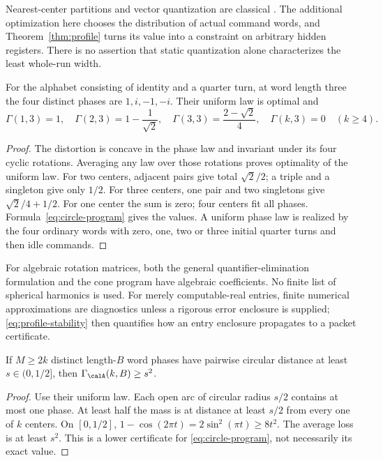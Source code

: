 Nearest-center partitions and vector quantization are classical \cite{GL}. The additional optimization here chooses the distribution of actual command words, and Theorem~\ref{thm:profile} turns its value into a constraint on arbitrary hidden registers. There is no assertion that static quantization alone characterizes the least whole-run width.

\begin{proposition}\label{prop:square-packet}
For the alphabet consisting of identity and a quarter turn, at word length three the four distinct phases are $1,i,-1,-i$. Their uniform law is optimal and
\[
 \Gamma(1,3)=1,\quad \Gamma(2,3)=1-\frac1{\sqrt2},\quad
 \Gamma(3,3)=\frac{2-\sqrt2}{4},\quad \Gamma(k,3)=0\quad(k\ge4).
\]
\end{proposition}
\begin{proof}
The distortion is concave in the phase law and invariant under its four cyclic rotations. Averaging any law over those rotations proves optimality of the uniform law. For two centers, adjacent pairs give total $\sqrt2/2$; a triple and a singleton give only $1/2$. For three centers, one pair and two singletons give $\sqrt2/4+1/2$. For one center the sum is zero; four centers fit all phases. Formula~\eqref{eq:circle-program} gives the values. A uniform phase law is realized by the four ordinary words with zero, one, two or three initial quarter turns and then idle commands.
\end{proof}

For algebraic rotation matrices, both the general quantifier-elimination formulation and the cone program have algebraic coefficients. No finite list of spherical harmonics is used. For merely computable-real entries, finite numerical approximations are diagnostics unless a rigorous error enclosure is supplied; \eqref{eq:profile-stability} then quantifies how an entry enclosure propagates to a packet certificate.

\begin{corollary}\label{cor:separated}
If $M\ge2k$ distinct length-$B$ word phases have pairwise circular distance at least $s\in(0,1/2]$, then $\Gamma_{\calA}(k,B)\ge s^2$.
\end{corollary}
\begin{proof}
Use their uniform law. Each open arc of circular radius $s/2$ contains at most one phase. At least half the mass is at distance at least $s/2$ from every one of $k$ centers. On $[0,1/2]$,
$1-\cos(2\pi t)=2\sin^2(\pi t)\ge8t^2$.
The average loss is at least $s^2$. This is a lower certificate for \eqref{eq:circle-program}, not necessarily its exact value.
\end{proof}
